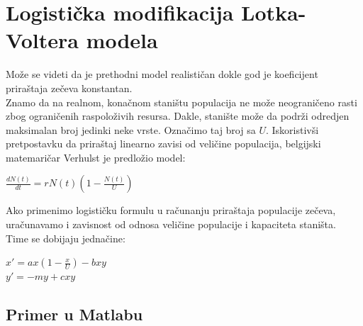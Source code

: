 \documentclass[a4paper]{article}
\begin{document}
\section{Logistička modifikacija Lotka-Voltera modela}
\label{sec:log_mod}
Može se videti da je prethodni model realističan dokle god je koeficijent priraštaja zečeva konstantan.\\
Znamo da na realnom, konačnom staništu populacija ne može neograničeno rasti zbog
ograničenih raspoloživih resursa. Dakle, stanište može da podrži odredjen maksimalan broj
jedinki neke vrste. Označimo taj broj sa $U$. Iskoristivši pretpostavku
da priraštaj linearno zavisi od veličine populacija, belgijski matemaričar Verhulst je predložio model:
	\begin{center}
		$\frac{dN(t)}{dt}=rN (t) (1 - \frac{N (t)}{U})$
	\end{center}
Ako primenimo logističku formulu u računanju priraštaja populacije zečeva, uračunavamo i zavisnost
od odnosa veličine populacije i kapaciteta staništa.\\
Time se dobijaju jednačine:

	\begin{center}
		$x' = ax(1 - \frac{x}{U}) - bxy$\\
		$y' = -my + cxy$
	\end{center}

\subsection{Primer u Matlabu}
\label{sub:log_mod_matlab}


\end{document}
